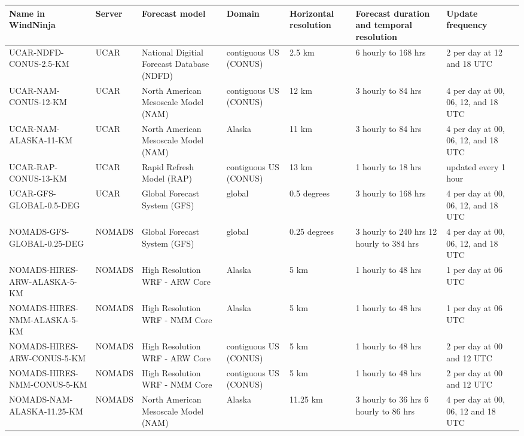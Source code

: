 \documentclass[12pt]{article}
\begin{document}
\begin{landscape}
\begin{table}
\fontsize{8}{12}\selectfont 
\begin{tabular}{|p{6cm}|p{1.3cm}|p{3.5cm}|p{2cm}|p{1.7cm}|p{2.8cm}|p{2.8cm}|}
\hline
\rowcolor{lightgray} Name in WindNinja & Server & Forecast model & Domain & Horizontal resolution & Forecast duration and temporal resolution & Update frequency\\
\hline
UCAR-NDFD-CONUS-2.5-KM & UCAR & National Digitial Forecast Database (NDFD) & contiguous US (CONUS) & 2.5 km & 6 hourly to 168 hrs & 2 per day at 12 and 18 UTC\\
\hline
UCAR-NAM-CONUS-12-KM & UCAR & North American Mesoscale Model (NAM) & contiguous US (CONUS) & 12 km & 3 hourly to 84 hrs & 4 per day at 00, 06, 12, and 18 UTC\\
\hline
UCAR-NAM-ALASKA-11-KM & UCAR & North American Mesoscale Model (NAM) & Alaska & 11 km & 3 hourly to 84 hrs & 4 per day at 00, 06, 12, and 18 UTC\\
\hline
UCAR-RAP-CONUS-13-KM & UCAR & Rapid Refresh Model (RAP) & contiguous US (CONUS) & 13 km & 1 hourly to 18 hrs & updated every 1 hour\\
\hline
UCAR-GFS-GLOBAL-0.5-DEG & UCAR & Global Forecast System (GFS) & global & 0.5 degrees & 3 hourly to 168 hrs & 4 per day at 00, 06, 12, and 18 UTC\\
\hline
NOMADS-GFS-GLOBAL-0.25-DEG & NOMADS & Global Forecast System (GFS) & global & 0.25 degrees & 3 hourly to 240 hrs 12 hourly to 384 hrs & 4 per day at 00, 06, 12, and 18 UTC\\
\hline
NOMADS-HIRES-ARW-ALASKA-5-KM & NOMADS & High Resolution WRF - ARW Core & Alaska & 5 km & 1 hourly to 48 hrs & 1 per day at 06 UTC\\
\hline
NOMADS-HIRES-NMM-ALASKA-5-KM & NOMADS & High Resolution WRF - NMM Core & Alaska & 5 km & 1 hourly to 48 hrs & 1 per day at 06 UTC\\
\hline
NOMADS-HIRES-ARW-CONUS-5-KM & NOMADS & High Resolution WRF - ARW Core & contiguous US (CONUS) & 5 km & 1 hourly to 48 hrs & 2 per day at 00 and 12 UTC\\
\hline
NOMADS-HIRES-NMM-CONUS-5-KM & NOMADS & High Resolution WRF - NMM Core & contiguous US (CONUS) & 5 km & 1 hourly to 48 hrs & 2 per day at 00 and 12 UTC\\
\hline
NOMADS-NAM-ALASKA-11.25-KM & NOMADS & North American Mesoscale Model (NAM) & Alaska & 11.25 km & 3 hourly to 36 hrs 6 hourly to 86 hrs & 4 per day at 00, 06, 12 and 18 UTC\\

\end{tabular}
\end{table}
\end{landscape}
\end{document}
